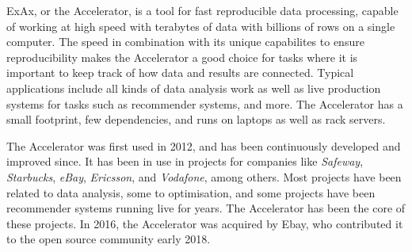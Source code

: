 
ExAx, or the Accelerator, is a tool for fast reproducible data processing,
capable of working at high speed with terabytes of data with billions
of rows on a single computer.  The speed in combination with its
unique capabilites to ensure reproducibility makes the Accelerator a
good choice for tasks where it is important to keep track of how data
and results are connected.  Typical applications include all kinds of
data analysis work as well as live production systems for tasks such
as recommender systems, and more.  The Accelerator has a small
footprint, few dependencies, and runs on laptops as well as rack
servers.

The Accelerator was first used in 2012, and has been continuously developed and
improved since.  It has been in use in projects for companies like
\textsl{Safeway}, \textsl{Starbucks}, \textsl{eBay}, \textsl{Ericsson},
and \textsl{Vodafone}, among others.  Most projects have been related to data
analysis, some to optimisation, and some projects have been
recommender systems running live for years.  The Accelerator has
been the core of these projects.  In 2016, the Accelerator was
acquired by Ebay, who contributed it to the open source community
early 2018.

